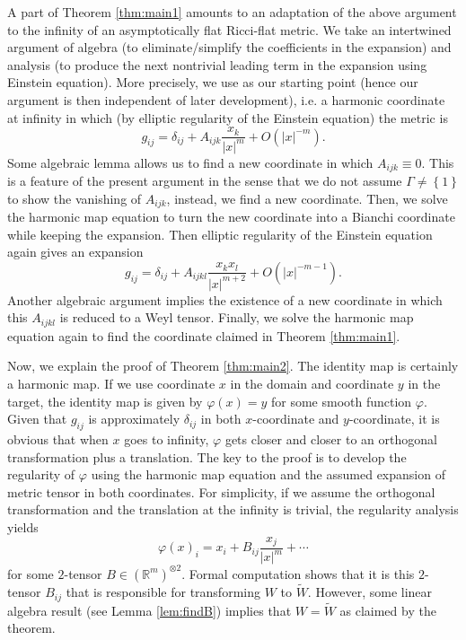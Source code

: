\documentclass{amsart}
\newcommand{\abs}[1]{\left\vert#1\right\vert}
\newcommand{\set}[1]{\left\{#1\right\}}
\newcommand{\Real}{\mathbb R}
\numberwithin{equation}{section}
\begin{document}
A part of Theorem \ref{thm:main1} amounts to an adaptation of the above argument to the infinity of an asymptotically flat  Ricci-flat metric. We take an intertwined argument of algebra (to eliminate/simplify the coefficients in the expansion) and analysis (to produce the next nontrivial leading term in the expansion using Einstein equation). More precisely, we use \cite{bando1989on} as our starting point (hence our argument is then independent of later development), i.e. a harmonic coordinate at infinity in which (by elliptic regularity of the Einstein equation) the metric is
\[
	g_{ij}=\delta_{ij}+A_{ijk}\frac{x_k}{\abs{x}^m} + O(\abs{x}^{-m}).
\]
Some algebraic lemma allows us to find a new coordinate in which $A_{ijk}\equiv 0$. This is a feature of the present argument in the sense that we do not assume $\Gamma\ne \set{1}$ to show the vanishing of $A_{ijk}$, instead, we find a new coordinate. Then, we solve the harmonic map equation to turn the new coordinate into a Bianchi coordinate while keeping the expansion. Then elliptic regularity of the Einstein equation again gives an expansion
\[
	g_{ij}=\delta_{ij}+ A_{ijkl}\frac{x_kx_l}{\abs{x}^{m+2}}+ O(\abs{x}^{-m-1}).
\]
Another algebraic argument implies the existence of a new coordinate in which this $A_{ijkl}$ is reduced to a Weyl tensor. Finally, we solve the harmonic map equation again to find the coordinate claimed in Theorem \ref{thm:main1}.

Now, we explain the proof of Theorem \ref{thm:main2}. The identity map is certainly a harmonic map. If we use coordinate $x$ in the domain and coordinate $y$ in the target, the identity map is given by $\varphi(x)=y$ for some smooth function $\varphi$. Given that $g_{ij}$ is approximately $\delta_{ij}$ in both $x$-coordinate and $y$-coordinate, it is obvious that when $x$ goes to infinity, $\varphi$ gets closer and closer to an orthogonal transformation plus a translation. The key to the proof is to develop the regularity of $\varphi$ using the harmonic map equation and the assumed expansion of metric tensor in both coordinates. For simplicity, if we assume the orthogonal transformation and the translation at the infinity is trivial, the regularity analysis yields
\[
	\varphi(x)_i=x_i + B_{ij}\frac{x_j}{\abs{x}^m}+ \cdots 
\]
for some $2$-tensor $B\in (\Real^m)^{\otimes 2}$.
Formal computation shows that it is this $2$-tensor $B_{ij}$ that is responsible for transforming $W$ to $\tilde{W}$. However, some linear algebra result (see Lemma \ref{lem:findB}) implies that $W=\tilde{W}$ as claimed by the theorem.
\end{document}
